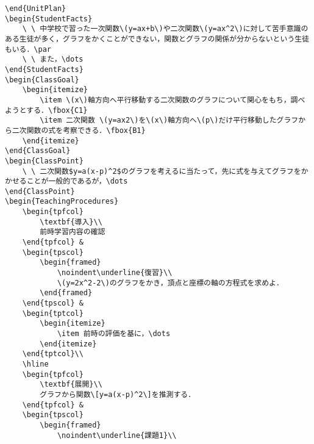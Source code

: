 \documentclass[paper=a4,fontsize=10.5pt]{jlreq}
\begin{document}
\begin{lstlisting}
\end{UnitPlan}
\begin{StudentFacts}
    \ \ 中学校で習った一次関数\(y=ax+b\)や二次関数\(y=ax^2\)に対して苦手意識のある生徒が多く，グラフをかくことができない，関数とグラフの関係が分からないという生徒もいる．\par
    \ \ また，\dots
\end{StudentFacts}
\begin{ClassGoal}
    \begin{itemize}
        \item \(x\)軸方向へ平行移動する二次関数のグラフについて関心をもち，調べようとする．\fbox{C1}
        \item 二次関数 \(y=ax2\)を\(x\)軸方向へ\(p\)だけ平行移動したグラフから二次関数の式を考察できる．\fbox{B1}
    \end{itemize}
\end{ClassGoal}
\begin{ClassPoint}
    \ \ 二次関数$y=a(x-p)^2$のグラフを考えるに当たって，先に式を与えてグラフをかかせることが一般的であるが，\dots
\end{ClassPoint}
\begin{TeachingProcedures}
    \begin{tpfcol}
        \textbf{導入}\\
        前時学習内容の確認
    \end{tpfcol} &
    \begin{tpscol}
        \begin{framed}
            \noindent\underline{復習}\\
            \(y=2x^2-2\)のグラフをかき，頂点と座標の軸の方程式を求めよ．
        \end{framed}
    \end{tpscol} &
    \begin{tptcol}
        \begin{itemize}
            \item 前時の評価を基に，\dots
        \end{itemize}
    \end{tptcol}\\
    \hline
    \begin{tpfcol}
        \textbf{展開}\\
        グラフから関数\[y=a(x-p)^2\]を推測する．
    \end{tpfcol} &
    \begin{tpscol}
        \begin{framed}
            \noindent\underline{課題1}\\

\end{lstlisting}
\end{document}
